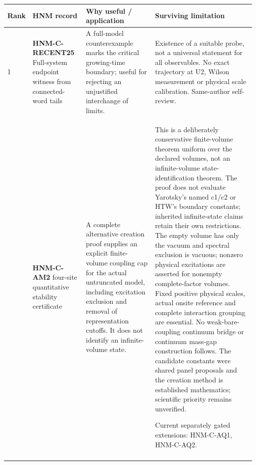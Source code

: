 \begin{longtable}{@{}p{8mm}p{44mm}p{53mm}p{43mm}@{}}
\toprule Rank & HNM record & Why useful / application & Surviving limitation\\\midrule\endhead
1 & \textbf{HNM-C-RECENT25} Full-system endpoint witness from connected-word tails & A full-model counterexample marks the critical growing-time boundary; useful for rejecting an unjustified interchange of limits. & Existence of a suitable probe, not a universal statement for all observables. No exact trajectory at U2, Wilson measurement or physical scale calibration. Same-author self-review.\\\addlinespace
2 & \textbf{HNM-C-AM2} four-site quantitative stability certificate & A complete alternative creation proof supplies an explicit finite-volume coupling cap for the actual untruncated model, including excitation exclusion and removal of representation cutoffs. It does not identify an infinite-volume state. & This is a deliberately conservative finite-volume theorem uniform over the declared volumes, not an infinite-volume state-identification theorem. The proof does not evaluate Yarotsky's named c1/c2 or HTW's boundary constants; inherited infinite-state claims retain their own restrictions. The empty volume has only the vacuum and spectral exclusion is vacuous; nonzero physical excitations are asserted for nonempty complete-factor volumes. Fixed positive physical scales, actual onsite reference and complete interaction grouping are essential. No weak-bare-coupling continuum bridge or continuum mass-gap construction follows. The candidate constants were shared panel proposals and the creation method is established mathematics; scientific priority remains unverified.\par Current separately gated extensions: HNM-C-AQ1, HNM-C-AQ2.\\\addlinespace

\end{longtable}
